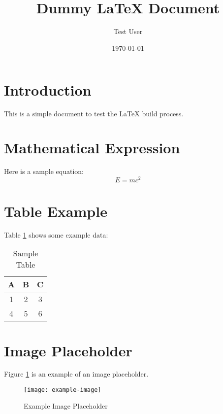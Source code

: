 \documentclass{article}
\begin{document}
\title{Dummy LaTeX Document}
\author{Test User}
\date{\today}

\maketitle

\section{Introduction}
This is a simple document to test the LaTeX build process.

\section{Mathematical Expression}
Here is a sample equation:
\begin{equation}
    E = mc^2
\end{equation}

\section{Table Example}
Table \ref{tab:sample} shows some example data:
\begin{table}[h]
    \centering
    \begin{tabular}{|c|c|c|}
        \hline
        A & B & C \\
        \hline
        1 & 2 & 3 \\
        4 & 5 & 6 \\
        \hline
    \end{tabular}
    \caption{Sample Table}
    \label{tab:sample}
\end{table}

\section{Image Placeholder}
Figure \ref{fig:placeholder} is an example of an image placeholder.

\begin{figure}[h]
    \centering
    \texttt{[image: example-image]}
    \caption{Example Image Placeholder}
    \label{fig:placeholder}
\end{figure}
\end{document}
